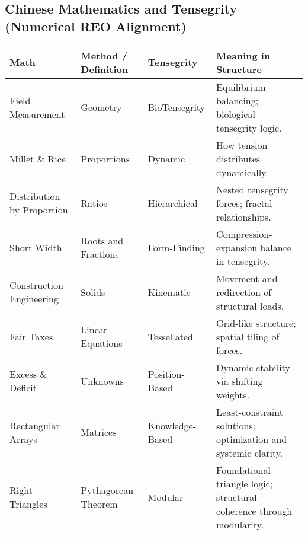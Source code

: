 \documentclass{article}
\begin{document}
\begin{landscape}

\section*{Chinese Mathematics and Tensegrity (Numerical REO Alignment)}

\renewcommand{\arraystretch}{1.4}

\begin{tabular}{|p{3.2cm}|p{3.5cm}|p{3.5cm}|p{6.5cm}|}
\hline
\textbf{Math} & 
\textbf{Method / Definition} & 
\textbf{Tensegrity} & 
\textbf{Meaning in Structure} \\
\hline

Field Measurement & 
Geometry & 
BioTensegrity & 
Equilibrium balancing; biological tensegrity logic. \\
\hline

Millet \& Rice & 
Proportions & 
Dynamic & 
How tension distributes dynamically. \\
\hline

Distribution by Proportion & 
Ratios & 
Hierarchical & 
Nested tensegrity forces; fractal relationships. \\
\hline

Short Width & 
Roots and Fractions & 
Form-Finding & 
Compression-expansion balance in tensegrity. \\
\hline

Construction Engineering & 
Solids & 
Kinematic & 
Movement and redirection of structural loads. \\
\hline

Fair Taxes & 
Linear Equations & 
Tessellated & 
Grid-like structure; spatial tiling of forces. \\
\hline

Excess \& Deficit & 
Unknowns & 
Position-Based & 
Dynamic stability via shifting weights. \\
\hline

Rectangular Arrays & 
Matrices & 
Knowledge-Based & 
Least-constraint solutions; optimization and systemic clarity. \\
\hline

Right Triangles & 
Pythagorean Theorem & 
Modular & 
Foundational triangle logic; structural coherence through modularity. \\
\hline

\end{tabular}

\end{landscape}
\end{document}
